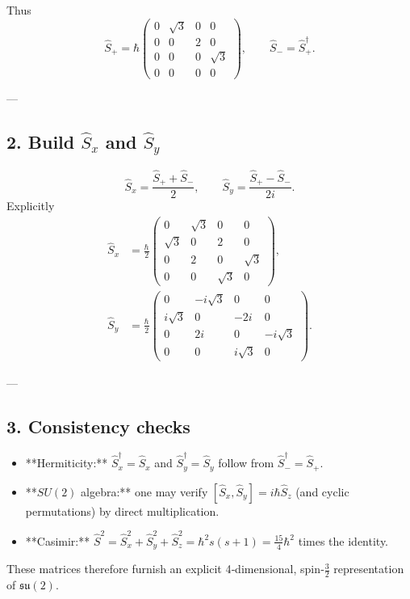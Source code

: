 \documentclass[12pt]{article}
\begin{document}
Thus
\[
  \boxed{
    \hat S_+ = \hbar
      \begin{pmatrix}
        0 & \sqrt{3} & 0 & 0 \\
        0 & 0 & 2 & 0 \\
        0 & 0 & 0 & \sqrt{3} \\
        0 & 0 & 0 & 0
      \end{pmatrix}
  },\qquad
  \hat S_- = \hat S_+^{\dagger}.
\]

---
\subsection*{2.  Build $\hat S_x$ and $\hat S_y$}
\[
  \hat S_x = \frac{\hat S_+ + \hat S_-}{2},\qquad
  \hat S_y = \frac{\hat S_+ - \hat S_-}{2i}.
\]
Explicitly
\begin{align}
  \hat S_x &= \frac{\hbar}{2}
  \begin{pmatrix}
    0 & \sqrt3 & 0 & 0 \\
    \sqrt3 & 0 & 2 & 0 \\
    0 & 2 & 0 & \sqrt3 \\
    0 & 0 & \sqrt3 & 0
  \end{pmatrix},\\[6pt]
  \hat S_y &= \frac{\hbar}{2}
  \begin{pmatrix}
    0 & -i\sqrt3 & 0 & 0 \\
    i\sqrt3 & 0 & -2i & 0 \\
    0 & 2i & 0 & -i\sqrt3 \\
    0 & 0 & i\sqrt3 & 0
  \end{pmatrix}.
\end{align}

---
\subsection*{3.  Consistency checks}
\begin{itemize}[leftmargin=2.2em]
  \item **Hermiticity:** $\hat S_x^{\dagger}=\hat S_x$ and $\hat S_y^{\dagger}=\hat S_y$ follow from $\hat S_-^{\dagger}=\hat S_+$.  
  \item **$SU(2)$ algebra:** one may verify
  $[\hat S_x,\hat S_y]=i\hbar\hat S_z$ (and cyclic permutations) by direct multiplication.
  \item **Casimir:** $\hat S^{2}=\hat S_x^{2}+\hat S_y^{2}+\hat S_z^{2}=\hbar^{2}s(s+1)=\tfrac{15}{4}\hbar^{2}$ times the identity.
\end{itemize}
These matrices therefore furnish an explicit 4‑dimensional, spin‑$\tfrac32$ representation of \(\mathfrak{su}(2)\).
\end{document}
